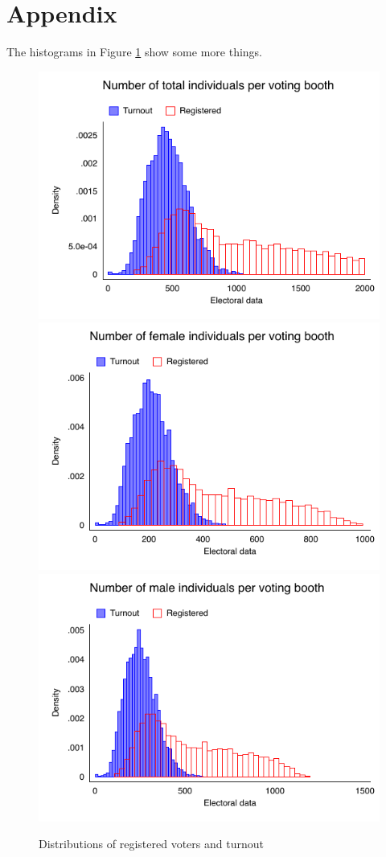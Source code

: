\documentclass[11pt]{article}
\begin{document}
\section{Appendix}

The histograms in Figure \ref{fig:histograms} show some more things.


\begin{figure}[H]\centering
\caption{Distributions of registered voters and turnout
\label{fig:histograms}}
\includegraphics[width=.32\textwidth]{../analysis/output/fig-hist-total.pdf}
\includegraphics[width=.32\textwidth]{../analysis/output/fig-hist-female.pdf}
\includegraphics[width=.32\textwidth]{../analysis/output/fig-hist-male.pdf}
\captionsetup{belowskip=-10pt, font=normalfont, width=.94\textwidth}
\end{figure}


\newpage
\printbibliography
\end{document}
